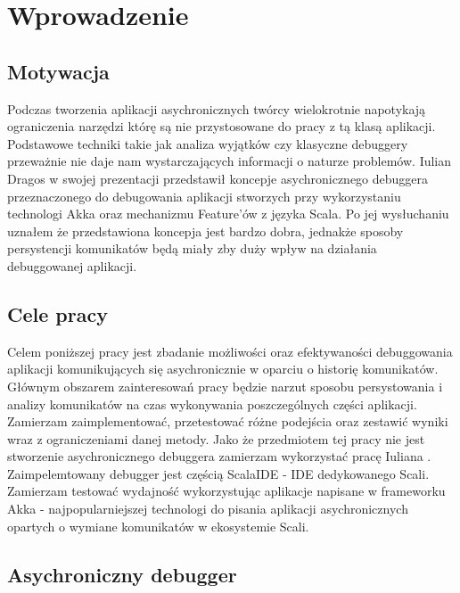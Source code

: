 \chapter{Wprowadzenie}


\section{Motywacja}

Podczas tworzenia aplikacji asychronicznych twórcy wielokrotnie napotykają ograniczenia narzędzi którę są nie przystosowane do pracy z tą klasą aplikacji. Podstawowe techniki takie jak analiza wyjątków czy klasyczne debuggery przeważnie nie daje nam wystarczających informacji o naturze problemów. Iulian Dragos w swojej prezentacji  \cite{rethingningDebugger} przedstawił koncepje asychronicznego debuggera przeznaczonego do debugowania aplikacji stworzych przy wykorzystaniu technologi Akka oraz mechanizmu Feature'ów z języka Scala. Po jej wysłuchaniu uznałem że przedstawiona koncepja jest bardzo dobra, jednakże sposoby persystencji komunikatów będą miały zby duży wpływ na działania debuggowanej aplikacji.



\section{Cele pracy}

Celem poniższej pracy jest zbadanie możliwości oraz efektywaności debuggowania aplikacji komunikujących się asychronicznie w oparciu o historię komunikatów. Głównym obszarem zainteresowań pracy będzie narzut sposobu persystowania i analizy komunikatów na czas wykonywania poszczególnych części aplikacji. Zamierzam zaimplementować, przetestować różne podejścia oraz zestawić wyniki wraz z ograniczeniami danej metody. Jako że przedmiotem tej pracy nie jest stworzenie asychronicznego debuggera zamierzam wykorzystać pracę Iuliana \cite{asychDebuggerGh}. Zaimpelemtowany debugger jest częścią ScalaIDE - IDE dedykowanego Scali. Zamierzam testować wydajność wykorzystując aplikacje napisane w frameworku Akka - najpopularniejszej technologi do pisania aplikacji asychronicznych opartych o wymiane komunikatów w ekosystemie Scali.


\section{Asychroniczny debugger}



